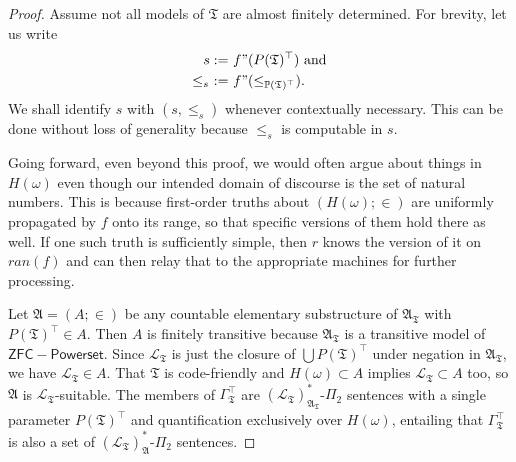 \documentclass[12pt]{article}
\numberwithin{equation}{section}
\begin{document}
\begin{proof}
Assume not all models of $\mathfrak{T}$ are almost finitely determined. For brevity, let us write
\begin{align*}
    s := \ & f" (P(\mathfrak{T})^{\top}) \text{ and} \\
    \leq_s \ := \ & f" (\leq_{\mathbb{P}(\mathfrak{T})^{\top}}) \text{.}
\end{align*} 
We shall identify $s$ with $(s, \leq_s)$ whenever contextually necessary. This can be done without loss of generality because $\leq_s$ is computable in $s$.

Going forward, even beyond this proof, we would often argue about things in $H(\omega)$ even though our intended domain of discourse is the set of natural numbers. This is because first-order truths about $(H(\omega); \in)$ are uniformly propagated by $f$ onto its range, so that specific versions of them hold there as well. If one such truth is sufficiently simple, then $r$ knows the version of it on $ran(f)$ and can then relay that to the appropriate machines for further processing. 

Let $\mathfrak{A} = (A; \in)$ be any countable elementary substructure of $\mathfrak{A}_{\mathfrak{T}}$ with $P(\mathfrak{T})^{\top} \in A$. Then $A$ is finitely transitive because $\mathfrak{A}_{\mathfrak{T}}$ is a transitive model of $\mathsf{ZFC - Powerset}$. Since $\mathcal{L}_{\mathfrak{T}}$ is just the closure of $\bigcup P(\mathfrak{T})^{\top}$ under negation in $\mathfrak{A}_{\mathfrak{T}}$, we have $\mathcal{L}_{\mathfrak{T}} \in A$. That $\mathfrak{T}$ is code-friendly and $H(\omega) \subset A$ implies $\mathcal{L}_{\mathfrak{T}} \subset A$ too, so $\mathfrak{A}$ is $\mathcal{L}_{\mathfrak{T}}$-suitable. The members of $\Gamma_{\mathfrak{T}}^{\top}$ are $(\mathcal{L}_{\mathfrak{T}})^*_{\mathfrak{A}_{\mathfrak{T}}}$-$\Pi_2$ sentences with a single parameter $P(\mathfrak{T})^{\top}$ and quantification exclusively over $H(\omega)$, entailing that $\Gamma_{\mathfrak{T}}^{\top}$ is also a set of $(\mathcal{L}_{\mathfrak{T}})^*_{\mathfrak{A}}$-$\Pi_2$ sentences. 


\end{proof}
\end{document}

